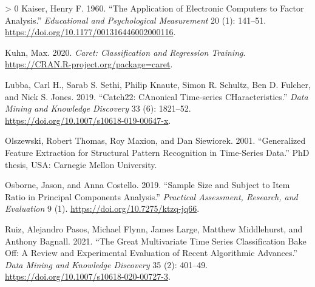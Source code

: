 \documentclass{article}
\newlength{\cslhangindent}
\newenvironment{CSLReferences}[3] %
 {%
  \setlength{\parindent}{0pt}
  \ifodd #1 \everypar{\setlength{\hangindent}{\cslhangindent}}\ignorespaces\fi
  \ifnum #2 > 0
  \setlength{\parskip}{#2\baselineskip}
  \fi
 }%
 {}
\begin{document}
\begin{CSLReferences}{1}{0}
\leavevmode\hypertarget{ref-Kaiser1960}{}%
Kaiser, Henry F. 1960. {``The Application of Electronic Computers to Factor Analysis.''} \emph{Educational and Psychological Measurement} 20 (1): 141--51. \url{https://doi.org/10.1177/001316446002000116}.

\leavevmode\hypertarget{ref-caret}{}%
Kuhn, Max. 2020. \emph{Caret: Classification and Regression Training}. \url{https://CRAN.R-project.org/package=caret}.

\leavevmode\hypertarget{ref-lubbaCatch22CAnonicalTimeseries2019}{}%
Lubba, Carl H., Sarab S. Sethi, Philip Knaute, Simon R. Schultz, Ben D. Fulcher, and Nick S. Jones. 2019. {``Catch22: {CAnonical Time-series CHaracteristics}.''} \emph{Data Mining and Knowledge Discovery} 33 (6): 1821--52. \url{https://doi.org/10.1007/s10618-019-00647-x}.

\leavevmode\hypertarget{ref-wafer_data}{}%
Olszewski, Robert Thomas, Roy Maxion, and Dan Siewiorek. 2001. {``Generalized Feature Extraction for Structural Pattern Recognition in Time-Series Data.''} PhD thesis, USA: Carnegie Mellon University.

\leavevmode\hypertarget{ref-osborneSampleSizeSubject2019}{}%
Osborne, Jason, and Anna Costello. 2019. {``Sample Size and Subject to Item Ratio in Principal Components Analysis.''} \emph{Practical Assessment, Research, and Evaluation} 9 (1). \url{https://doi.org/10.7275/ktzq-jq66}.

\leavevmode\hypertarget{ref-ruizGreatMultivariateTime2021}{}%
Ruiz, Alejandro Pasos, Michael Flynn, James Large, Matthew Middlehurst, and Anthony Bagnall. 2021. {``The Great Multivariate Time Series Classification Bake Off: A Review and Experimental Evaluation of Recent Algorithmic Advances.''} \emph{Data Mining and Knowledge Discovery} 35 (2): 401--49. \url{https://doi.org/10.1007/s10618-020-00727-3}.

\end{CSLReferences}



\end{document}
